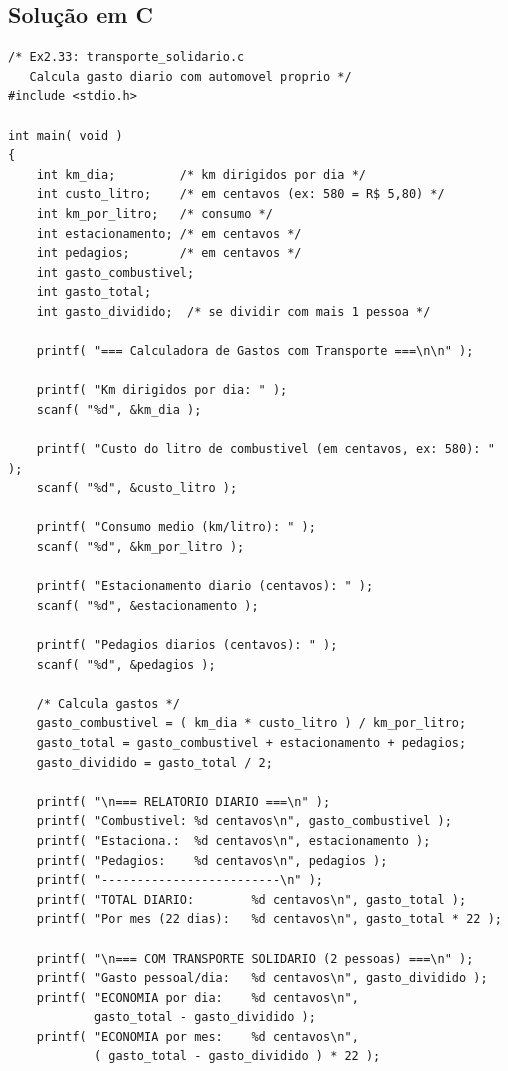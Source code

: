 \documentclass[12pt,a4paper]{article}
\begin{document}
\subsection*{Solução em C}

\begin{respostabox}
\begin{lstlisting}
/* Ex2.33: transporte_solidario.c
   Calcula gasto diario com automovel proprio */
#include <stdio.h>

int main( void )
{
    int km_dia;         /* km dirigidos por dia */
    int custo_litro;    /* em centavos (ex: 580 = R$ 5,80) */
    int km_por_litro;   /* consumo */
    int estacionamento; /* em centavos */
    int pedagios;       /* em centavos */
    int gasto_combustivel;
    int gasto_total;
    int gasto_dividido;  /* se dividir com mais 1 pessoa */

    printf( "=== Calculadora de Gastos com Transporte ===\n\n" );

    printf( "Km dirigidos por dia: " );
    scanf( "%d", &km_dia );

    printf( "Custo do litro de combustivel (em centavos, ex: 580): " );
    scanf( "%d", &custo_litro );

    printf( "Consumo medio (km/litro): " );
    scanf( "%d", &km_por_litro );

    printf( "Estacionamento diario (centavos): " );
    scanf( "%d", &estacionamento );

    printf( "Pedagios diarios (centavos): " );
    scanf( "%d", &pedagios );

    /* Calcula gastos */
    gasto_combustivel = ( km_dia * custo_litro ) / km_por_litro;
    gasto_total = gasto_combustivel + estacionamento + pedagios;
    gasto_dividido = gasto_total / 2;

    printf( "\n=== RELATORIO DIARIO ===\n" );
    printf( "Combustivel: %d centavos\n", gasto_combustivel );
    printf( "Estaciona.:  %d centavos\n", estacionamento );
    printf( "Pedagios:    %d centavos\n", pedagios );
    printf( "-------------------------\n" );
    printf( "TOTAL DIARIO:        %d centavos\n", gasto_total );
    printf( "Por mes (22 dias):   %d centavos\n", gasto_total * 22 );

    printf( "\n=== COM TRANSPORTE SOLIDARIO (2 pessoas) ===\n" );
    printf( "Gasto pessoal/dia:   %d centavos\n", gasto_dividido );
    printf( "ECONOMIA por dia:    %d centavos\n",
            gasto_total - gasto_dividido );
    printf( "ECONOMIA por mes:    %d centavos\n",
            ( gasto_total - gasto_dividido ) * 22 );


\end{lstlisting}
\end{respostabox}
\end{document}
